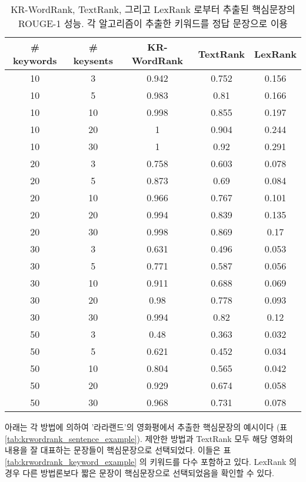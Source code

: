 \documentclass[oneside, ko,phd]{snuthesis_utf8_kor}
\begin{document}
\begin{table}[H]
\centering
\small
\label{tab:krwordrank_sentence_performance}
\caption{KR-WordRank, TextRank, 그리고 LexRank 로부터 추출된 핵심문장의 ROUGE-1 성능. 각 알고리즘이 추출한 키워드를 정답 문장으로 이용}
\begin{tabular}{|c|c|c|c|c|}
\hline
\textbf{\# keywords} & \textbf{\# keysents} & \textbf{KR-WordRank} & \textbf{TextRank} & \textbf{LexRank} \\ \hline
10 & 3 & 0.942 & 0.752 & 0.156 \\ \hline
10 & 5 & 0.983 & 0.81 & 0.166 \\ \hline
10 & 10 & 0.998 & 0.855 & 0.197 \\ \hline
10 & 20 & 1 & 0.904 & 0.244 \\ \hline
10 & 30 & 1 & 0.92 & 0.291 \\ \hline
20 & 3 & 0.758 & 0.603 & 0.078 \\ \hline
20 & 5 & 0.873 & 0.69 & 0.084 \\ \hline
20 & 10 & 0.966 & 0.767 & 0.101 \\ \hline
20 & 20 & 0.994 & 0.839 & 0.135 \\ \hline
20 & 30 & 0.998 & 0.869 & 0.17 \\ \hline
30 & 3 & 0.631 & 0.496 & 0.053 \\ \hline
30 & 5 & 0.771 & 0.587 & 0.056 \\ \hline
30 & 10 & 0.911 & 0.688 & 0.069 \\ \hline
30 & 20 & 0.98 & 0.778 & 0.093 \\ \hline
30 & 30 & 0.994 & 0.82 & 0.12 \\ \hline
50 & 3 & 0.48 & 0.363 & 0.032 \\ \hline
50 & 5 & 0.621 & 0.452 & 0.034 \\ \hline
50 & 10 & 0.804 & 0.565 & 0.042 \\ \hline
50 & 20 & 0.929 & 0.674 & 0.058 \\ \hline
50 & 30 & 0.968 & 0.731 & 0.078 \\ \hline
\end{tabular}
\end{table}

아래는 각 방법에 의하여 '라라랜드'의 영화평에서 추출한 핵심문장의 예시이다 (표 \ref{tab:krwordrank_sentence_example}).
제안한 방법과 TextRank 모두 해당 영화의 내용을 잘 대표하는 문장들이 핵심문장으로 선택되었다.
이들은 표 \ref{tab:krwordrank_keyword_example} 의 키워드를 다수 포함하고 있다.
LexRank 의 경우 다른 방법론보다 짧은 문장이 핵심문장으로 선택되었음을 확인할 수 있다.
\end{document}
